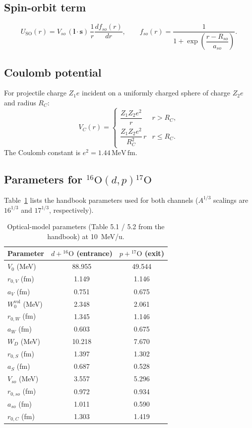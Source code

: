 \documentclass[12pt,a4paper]{article}
\newcommand{\fm}{\,\mathrm{fm}}
\newcommand{\MeV}{\,\mathrm{MeV}}
\begin{document}
\subsection{Spin-orbit term}

\begin{equation}
  U_\mathrm{SO}(r) = V_{so}\,(\bm{l}\cdot\bm{s})\,
  \frac{1}{r}\frac{df_{so}(r)}{dr},
  \qquad
  f_{so}(r) = \frac{1}{1+\exp\!\left(\dfrac{r-R_{so}}{a_{so}}\right)}.
\end{equation}

\subsection{Coulomb potential}

For projectile charge $Z_1 e$ incident on a uniformly charged sphere
of charge $Z_2 e$ and radius $R_C$:
\begin{equation}
  V_C(r) = \begin{cases}
    \dfrac{Z_1 Z_2 e^2}{r} & r > R_C,\\[6pt]
    \dfrac{Z_1 Z_2 e^2}{R_C^2}\,r & r \le R_C.
  \end{cases}
\end{equation}
The Coulomb constant is $e^2 = 1.44\MeV\fm$.

\subsection{Parameters for ${}^{16}\mathrm{O}(d,p){}^{17}\mathrm{O}$}

Table~\ref{tab:omp-o16dp} lists the handbook parameters used for both
channels ($A^{1/3}$ scalings are $16^{1/3}$ and $17^{1/3}$,
respectively).

\begin{table}[h]
\centering
\caption{Optical-model parameters (Table 5.1 / 5.2 from the handbook)
         at 10~MeV/u.}
\label{tab:omp-o16dp}
\begin{tabular}{lcc}
\toprule
Parameter & $d+{}^{16}\mathrm{O}$ (entrance) & $p+{}^{17}\mathrm{O}$ (exit) \\
\midrule
$V_0$ (MeV)       & 88.955 & 49.544 \\
$r_{0,V}$ (fm)    & 1.149  & 1.146  \\
$a_V$ (fm)        & 0.751  & 0.675  \\
$W_0^\mathrm{vol}$ (MeV) & 2.348 & 2.061 \\
$r_{0,W}$ (fm)    & 1.345  & 1.146  \\
$a_W$ (fm)        & 0.603  & 0.675  \\
$W_D$ (MeV)       & 10.218 & 7.670  \\
$r_{0,S}$ (fm)    & 1.397  & 1.302  \\
$a_S$ (fm)        & 0.687  & 0.528  \\
$V_{so}$ (MeV)    & 3.557  & 5.296  \\
$r_{0,so}$ (fm)   & 0.972  & 0.934  \\
$a_{so}$ (fm)     & 1.011  & 0.590  \\
$r_{0,C}$ (fm)    & 1.303  & 1.419  \\
\bottomrule
\end{tabular}
\end{table}
\end{document}
